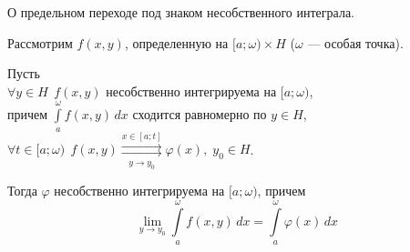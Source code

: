 \begin{theorem*} О предельном переходе под знаком несобственного интеграла.

    Рассмотрим $f(x, y)$, определенную на $[a; \omega) \times H$ ($\omega$ --- особая точка).
    
    Пусть \\
    \phantom{Пусть} $\forall y \in H \ \ f(x, y)$ несобственно интегрируема на $[a; \omega)$, \\
    \phantom{Пусть} причем $\int\limits_{a}^{\omega} f(x, y)\,dx$ сходится равномерно по $y \in H$, \\
    \phantom{Пусть} $\forall t \in [a; \omega) \ \ 
    f(x, y) \overset{x \in [a; t]}{\underset{y \to y_0}{\rightrightarrows}} \varphi(x), \; y_0 \in H$.
    
    Тогда $\varphi$ несобственно интегрируема на $[a; \omega)$, причем 
    \[ \lim_{y \to y_0} \int\limits_{a}^{\omega} f(x, y)\,dx = \int\limits_{a}^{\omega} \varphi(x)\,dx \]
\end{theorem*}
